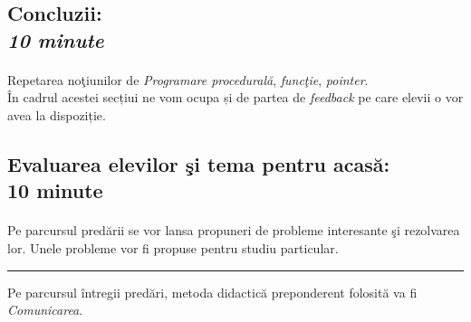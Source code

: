 \documentclass{article}
\newcommand{\itl}{\textit}
\begin{document}
\subsection{Concluzii:\\ \itl{10 minute}}

\paragraph{}
Repetarea no\c tiunilor de \textit{Programare procedural\u  a}, \textit{func\c tie}, \textit{pointer}.\\În cadrul acestei secțiui ne vom ocupa și de partea de \itl{feedback} pe care elevii o vor avea la dispoziție.



\subsection{Evaluarea elevilor \c si tema pentru acas\u a: \\ 10 minute }

\paragraph{}
Pe parcursul pred\u arii se vor lansa propuneri de probleme interesante \c si rezolvarea lor. Unele probleme vor fi propuse pentru studiu particular. 

\hfill

\hrulefill
\hrule
\hrulefill
\begin{flushright}
	Pe parcursul întregii predări, metoda didactică preponderent folosită va fi \itl{Comunicarea}.

\end{flushright}
\end{document}
